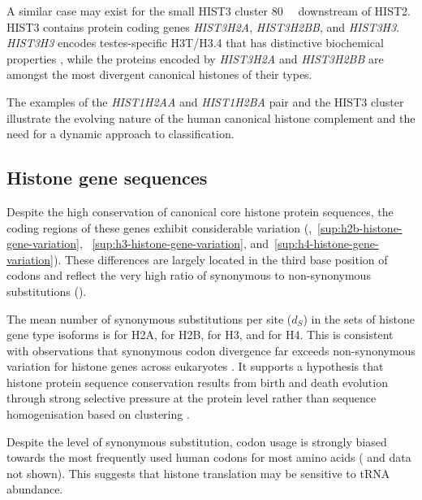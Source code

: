     A similar case may exist for the small HIST3 cluster \SI{80}{\mega\bp} downstream of HIST2.
    HIST3 contains protein coding genes \textit{HIST3H2A}, \textit{HIST3H2BB}, and \textit{HIST3H3}.
    \textit{HIST3H3} encodes testes-specific H3T/H3.4
    that has distinctive biochemical properties \citep{WittExpCellRes1996,KurumizakaCOSB2013},
    while the proteins encoded by \textit{HIST3H2A} and \textit{HIST3H2BB}
    are amongst the most divergent canonical histones of their types.

    The examples of the \textit{HIST1H2AA} and \textit{HIST1H2BA} pair
    and the HIST3 cluster illustrate
    the evolving nature of the human canonical histone complement
    and the need for a dynamic approach to classification.

  \subsection{Histone gene sequences}
    Despite the high conservation of canonical core histone protein sequences,
    the coding regions of these genes exhibit considerable variation
    (,~\ref{sup:h2b-histone-gene-variation},
    ~\ref{sup:h3-histone-gene-variation}, and~\ref{sup:h4-histone-gene-variation}).
    These differences are largely located in the third base position of codons
    and reflect the very high ratio of synonymous to non-synonymous
    substitutions ().

    The mean number of synonymous substitutions per site ($d_S$)
    in the sets of histone gene type isoforms is
     \result{} for H2A,
     \result{} for H2B,
     \result{} for H3,
    and  \result{} for H4.
    This is consistent with observations that
    synonymous codon divergence far exceeds non-synonymous variation
    for histone genes across eukaryotes \citep{Piontkivska2002, Rooney2002}.
    It supports a hypothesis that histone protein sequence conservation
    results from birth and death evolution through strong selective pressure
    at the protein level rather than
    sequence homogenisation based on clustering \citep{NeiRooney2005}.

    Despite the level of synonymous substitution,
    codon usage is strongly biased towards the most frequently used
    human codons for most amino acids
    ( and data not shown).
    This suggests that histone translation may be sensitive to tRNA abundance.

